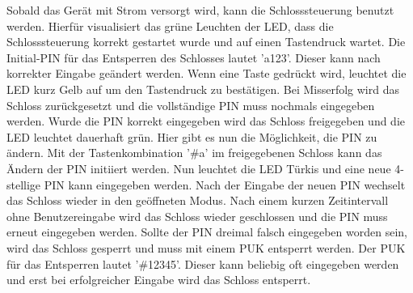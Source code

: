 Sobald das Gerät mit Strom versorgt wird, kann die Schlosssteuerung benutzt werden. Hierfür visualisiert das grüne Leuchten der LED, dass die Schlosssteuerung korrekt gestartet wurde und auf einen Tastendruck wartet. Die Initial-PIN für das Entsperren des Schlosses lautet 'a123'. Dieser kann nach korrekter Eingabe geändert werden. Wenn eine Taste gedrückt wird, leuchtet die LED kurz Gelb auf um den Tastendruck zu bestätigen. Bei Misserfolg wird das Schloss zurückgesetzt und die vollständige PIN muss nochmals eingegeben werden. Wurde die PIN korrekt eingegeben wird das Schloss freigegeben und die LED leuchtet dauerhaft grün. Hier gibt es nun die Möglichkeit, die PIN zu ändern. Mit der Tastenkombination '\#a' im freigegebenen Schloss kann das Ändern der PIN initiiert werden. Nun leuchtet die LED Türkis und eine neue 4-stellige PIN kann eingegeben werden. Nach der Eingabe der neuen PIN wechselt das Schloss wieder in den geöffneten Modus. Nach einem kurzen Zeitintervall ohne Benutzereingabe wird das Schloss wieder geschlossen und die PIN muss erneut eingegeben werden. Sollte der PIN dreimal falsch eingegeben worden sein, wird das Schloss gesperrt und muss mit einem PUK entsperrt werden. Der PUK für das Entsperren lautet '\#12345'. Dieser kann beliebig oft eingegeben werden und erst bei erfolgreicher Eingabe wird das Schloss entsperrt.